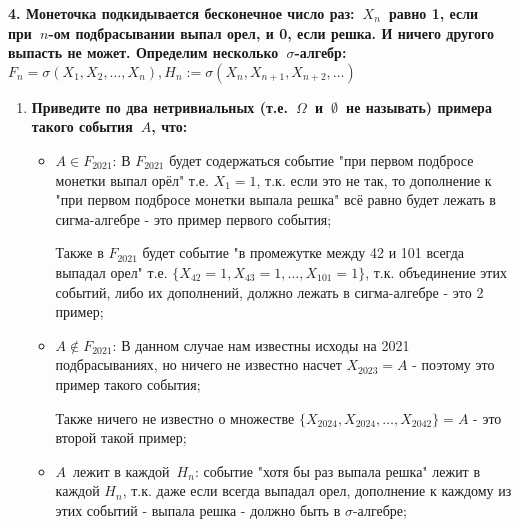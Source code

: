 \documentclass{article}
\begin{document}
\noindent \textbf{4. Монеточка подкидывается бесконечное число раз: $X_n$ равно 1, если при $n$-ом подбрасывании выпал орел, и 0, если решка. И ничего другого выпасть не может. Определим несколько $\sigma$-алгебр: $F_n=\sigma(X_1,X_2,…,X_n), H_n:=\sigma(X_n,X_{n+1},X_{n+2},…)$}
\begin{enumerate}
\item \textbf{Приведите по два нетривиальных (т.е. $\Omega$ и $\emptyset$ не называть) примера такого события $A$, что:}
\begin{itemize}
\item $A \in F_{2021}$: В $F_{2021}$ будет содержаться событие "при первом подбросе монетки выпал орёл" т.е. $X_1 = 1$, т.к. если это не так, то дополнение к "при первом подбросе монетки выпала решка" всё равно будет лежать в сигма-алгебре - это пример первого события;

Также в $F_{2021}$ будет событие "в промежутке между 42 и 101 всегда выпадал орел" т.е. $\{X_{42}=1, X_{43} = 1, \dots, X_{101} = 1\}$, т.к. объединение этих событий, либо их дополнений, должно лежать в сигма-алгебре - это 2 пример; 
\item $A \notin F_{2021}$: В данном случае нам известны исходы на 2021 подбрасываниях, но ничего не известно насчет $X_{2023} = A$ - поэтому это пример такого события;

Также ничего не известно о множестве $\{X_{2024}, X_{2024}, \dots, X_{2042}\} = A$ - это второй такой пример; 
\item $A$ лежит в каждой $H_n$: событие "хотя бы раз выпала решка" лежит в каждой $H_n$, т.к. даже если всегда выпадал орел, дополнение к каждому из этих событий - выпала решка - должно быть в $\sigma$-алгебре;


\end{itemize}
\end{enumerate}
\end{document}
